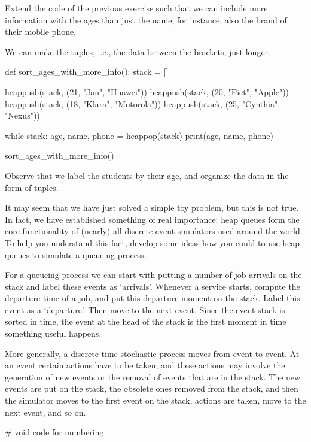\begin{exercise}
  Extend the code of the previous exercise such that we can include more information with the ages than just the name, for instance, also the brand of their mobile phone.
\begin{solution}
We can make the  tuples, i.e., the data between the brackets,  just longer.

\begin{pyverbatim}
def sort_ages_with_more_info():
    stack = []

    heappush(stack, (21, "Jan", "Huawei"))
    heappush(stack, (20, "Piet", "Apple"))
    heappush(stack, (18, "Klara", "Motorola"))
    heappush(stack, (25, "Cynthia", "Nexus"))

    while stack:
        age, name, phone = heappop(stack)
        print(age, name, phone)


sort_ages_with_more_info()
\end{pyverbatim}
Observe that we label the students by their age, and organize the data in the form of tuples.

\end{solution}
\end{exercise}


\begin{exercise}
  It may seem that we have just solved a simple toy problem, but this is not true.
  In fact, we have established something of real importance: heap queues form the core functionality of (nearly) all discrete event simulators used around the world.
  To help you understand this fact, develop some ideas how you could to use heap queues to simulate a queueing process.
\begin{solution}
  For a queueing process we can start with putting a number of job arrivals on the stack and label these events as `arrivals'.
  Whenever a service starts, compute the departure time of a job, and put this departure moment on the stack.
  Label this event as a `departure'.
  Then move to the next event.
  Since the event stack is sorted in time, the event at the head of the stack is the first moment in time something useful happens.

  More generally, a discrete-time stochastic process moves from event to event.
  At an event certain actions have to be taken, and these actions may involve the generation of new events or the removal of events that are in the stack.
  The new events are put on the stack, the obsolete ones removed from the stack, and then the simulator moves to the first event on the stack, actions are taken, move to the next event, and so on.

\begin{pyverbatim}
# void  code for numbering
\end{pyverbatim}
\end{solution}
\end{exercise}



